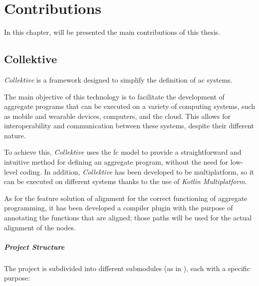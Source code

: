 
\chapter{Contributions}
\label{ch:contributions}
In this chapter, will be presented the main contributions of this thesis.

\section{Collektive}
\label{sec:collektive}

\emph{Collektive} is a framework designed to simplify the definition of \ac{ac} systems.

The main objective of this technology is to facilitate the development of aggregate programs that can be executed on a
variety of computing systems, such as mobile and wearable devices, computers, and the cloud.
This allows for interoperability and communication between these systems, despite their different nature.

To achieve this, \emph{Collektive} uses the \ac{fc} model to provide a straightforward and intuitive method for defining
an aggregate program, without the need for low-level coding.
In addition, \emph{Collektive} has been developed to be multiplatform, so it can be executed on different systems thanks
to the use of \emph{Kotlin Multiplatform}.

As for the feature solution of alignment for the correct functioning of aggregate programming,
it has been developed a compiler plugin with the purpose of annotating the functions that are aligned;
those paths will be used for the actual alignment of the nodes.

\paragraph{Project Structure}
The project is subdivided into different submodules (as in ), each with a specific purpose:

